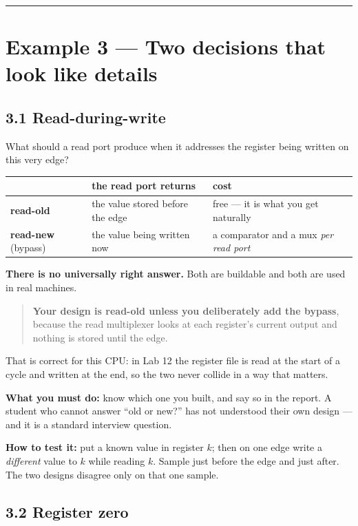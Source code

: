 \documentclass[11pt]{article}
\newcommand{\hr}{\vspace{2pt}\hrule\vspace{6pt}}
\begin{document}
\vspace{4pt}\hr

\section*{Example 3 --- Two decisions that look like details}

\subsection*{3.1 Read-during-write}

What should a read port produce when it addresses the register being written on
this very edge?

\begin{center}
\begin{tabular}{lll}
\toprule
& the read port returns & cost \\
\midrule
\textbf{read-old} & the value stored before the edge & free --- it is what you get naturally \\
\textbf{read-new} (bypass) & the value being written now & a comparator and a mux \emph{per read port} \\
\bottomrule
\end{tabular}
\end{center}

\textbf{There is no universally right answer.} Both are buildable and both are
used in real machines.

\begin{quote}
\textbf{Your design is read-old unless you deliberately add the bypass}, because
the read multiplexer looks at each register's current output and nothing is stored
until the edge.
\end{quote}

That is correct for this CPU: in Lab 12 the register file is read at the start of
a cycle and written at the end, so the two never collide in a way that matters.

\textbf{What you must do:} know which one you built, and say so in the report. A
student who cannot answer ``old or new?'' has not understood their own design ---
and it is a standard interview question.

\textbf{How to test it:} put a known value in register $k$; then on one edge write
a \emph{different} value to $k$ while reading $k$. Sample just before the edge and
just after. The two designs disagree only on that one sample.

\subsection*{3.2 Register zero}
\end{document}
